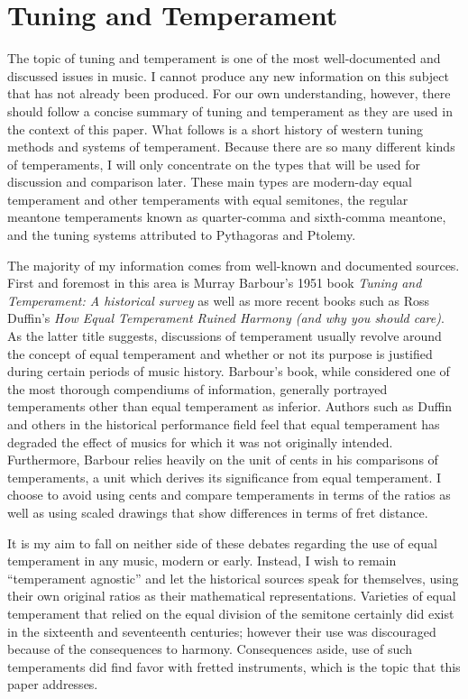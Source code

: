 \chapter{Tuning and Temperament}

The topic of tuning and temperament is one of the most well-documented and
discussed issues in music.  I cannot produce any new information on this subject that
has not already been produced.
For our own understanding, however, there should follow a
concise summary of tuning and temperament as they are used in the context of
this paper. What follows is a short history of western tuning methods and
systems of temperament.  Because there are so many different kinds of
temperaments, I will only concentrate on the types that will be used for
discussion and comparison later.  These main types are modern-day equal
temperament and other temperaments with equal semitones, the regular meantone
temperaments known as quarter-comma and sixth-comma meantone, and the tuning
systems attributed to Pythagoras and Ptolemy.

The majority of my information comes from well-known and documented sources.
First and foremost in this area is Murray Barbour's 1951 book \textit{Tuning and
Temperament: A historical survey} as well as more recent books such as Ross
Duffin's \textit{How Equal Temperament Ruined Harmony (and why you should
care)}.  As the latter title suggests, discussions of temperament usually
revolve around the concept of equal temperament and whether or not its purpose
is justified during certain periods of music history.  Barbour's book, while
considered one of the most thorough compendiums of information, generally
portrayed temperaments other than equal temperament as inferior. Authors such as
Duffin and others in the historical performance field feel that equal
temperament has degraded the effect of musics for which it was not originally
intended.  Furthermore, Barbour relies heavily on the unit of cents in his
comparisons of temperaments, a unit which derives its significance from equal
temperament.  I choose to avoid using cents and compare temperaments in terms of
the ratios as well as using scaled drawings that show differences in terms of
fret distance.

It is my aim to fall on neither side of these debates regarding the use
of equal temperament in any music, modern or early.  Instead, I wish to remain
``temperament agnostic'' and let the historical sources speak for themselves,
using their own original ratios as their mathematical representations.
Varieties of equal temperament that relied on the equal division of the
semitone certainly did exist in the sixteenth and seventeenth centuries;
however their use was discouraged because of the consequences to harmony.
Consequences aside, use of such temperaments did find favor with fretted
instruments, which is the topic that this paper addresses.

